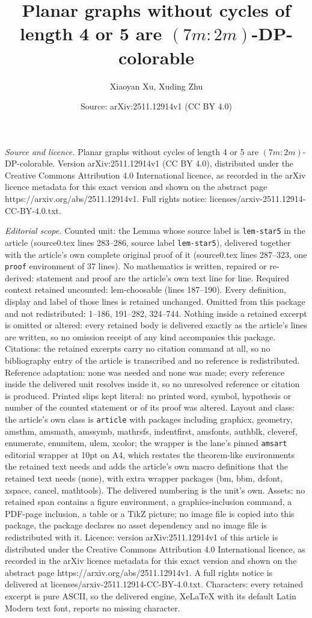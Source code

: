 \documentclass[10pt,a4paper]{amsart}
\title[Planar graphs without cycles of length 4 or 5 are $(7m:2m)$-]{Planar graphs without cycles of length 4 or 5 are $(7m:2m)$-DP-colorable}
\author{Xiaoyan Xu, Xuding Zhu}
\date{Source: arXiv:2511.12914v1 (CC BY 4.0)}
\begin{document}
\maketitle

\noindent\emph{Source and licence.} Planar graphs without cycles of length 4 or 5 are $(7m:2m)$-DP-colorable. Version arXiv:2511.12914v1 (CC BY 4.0), distributed under the Creative Commons Attribution 4.0 International licence, as recorded in the arXiv licence metadata for this exact version and shown on the abstract page https://arxiv.org/abs/2511.12914v1. Full rights notice: licenses/arxiv-2511.12914-CC-BY-4.0.txt.\par\smallskip

\noindent\textit{Editorial scope.} Counted unit: the Lemma whose source label is \texttt{lem-star5} in the article (source0.tex lines 283--286, source label \texttt{lem-star5}), delivered together with the article's own complete original proof of it (source0.tex lines 287--323, one \texttt{proof} environment of 37 lines). No mathematics is written, repaired or re-derived: statement and proof are the article's own text line for line. Required context retained uncounted: lem-choosable (lines 187--190). Every definition, display and label of those lines is retained unchanged. Omitted from this package and not redistributed: 1--186, 191--282, 324--744. Nothing inside a retained excerpt is omitted or altered: every retained body is delivered exactly as the article's lines are written, so no omission receipt of any kind accompanies this package. Citations: the retained excerpts carry no citation command at all, so no bibliography entry of the article is transcribed and no reference is redistributed. Reference adaptation: none was needed and none was made; every reference inside the delivered unit resolves inside it, so no unresolved reference or citation is produced. Printed slips kept literal: no printed word, symbol, hypothesis or number of the counted statement or of its proof was altered. Layout and class: the article's own class is \texttt{article} with packages including graphicx, geometry, amsthm, amsmath, amssymb, mathrsfs, indentfirst, amsfonts, authblk, cleveref, enumerate, enumitem, ulem, xcolor; the wrapper is the lane's pinned \texttt{amsart} editorial wrapper at 10pt on A4, which restates the theorem-like environments the retained text needs and adds the article's own macro definitions that the retained text needs (none), with extra wrapper packages (bm, bbm, dsfont, xspace, cancel, mathtools). The delivered numbering is the unit's own. Assets: no retained span contains a figure environment, a graphics-inclusion command, a PDF-page inclusion, a table or a TikZ picture; no image file is copied into this package, the package declares no asset dependency and no image file is redistributed with it. Licence: version arXiv:2511.12914v1 of this article is distributed under the Creative Commons Attribution 4.0 International licence, as recorded in the arXiv licence metadata for this exact version and shown on the abstract page https://arxiv.org/abs/2511.12914v1. A full rights notice is delivered at licenses/arxiv-2511.12914-CC-BY-4.0.txt. Characters: every retained excerpt is pure ASCII, so the delivered engine, XeLaTeX with its default Latin Modern text font, reports no missing character.
\end{document}
